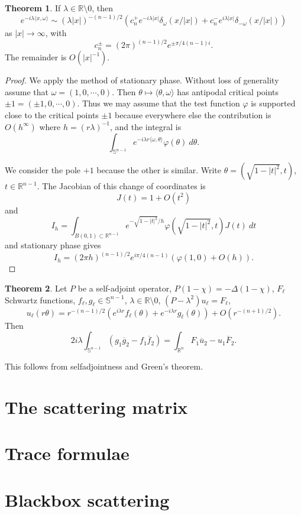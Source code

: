 \documentclass[12pt]{report}
\newcommand{\RR}{\mathbb{R}}
\newcommand{\Sphere}{\mathbb S}
\theoremstyle{definition}
\newtheorem{theorem}{Theorem}[chapter]
\begin{document}
\begin{theorem}
If $\lambda \in \RR \setminus 0$, then
$$e^{-i\lambda\langle x,\omega\rangle}\sim (\lambda|x|)^{-(n-1)/2}(c_n^+ e^{-i\lambda|x|}\delta_\omega(x/|x|) + c_n^- e^{i\lambda|x|}\delta_{-\omega}(x/|x|) )$$
as $|x| \to \infty$, with
$$c_n^\pm = (2\pi)^{(n-1)/2}e^{\pm \pi/4(n-1)i}.$$
The remainder is $O(|x|^{-1})$.
\end{theorem}
\begin{proof}
We apply the method of stationary phase.
Without loss of generality assume that $\omega = (1, 0, \cdots, 0)$. Then $\theta \mapsto \langle \theta, \omega\rangle$ has antipodal critical points $\pm 1 = (\pm 1, 0, \cdots, 0)$.
Thus we may assume that the test function $\varphi$ is supported close to the critical points $\pm 1$ because everywhere else the contribution is $O(h^\infty)$ where $h = (r\lambda)^{-1}$, and the integral is
$$\int_{\Sphere^{n-1}} e^{-i\lambda r\langle \omega,\theta\rangle} \varphi(\theta)~d\theta.$$

We consider the pole $+1$ because the other is similar. Write $\theta = (\sqrt{1 - |t|^2}, t)$, $t \in \RR^{n-1}$.
The Jacobian of this change of coordinates is
$$J(t) = 1 + O(t^2)$$
and
$$I_h = \int_{B(0, 1) \subset \RR^{n-1}} e^{-\sqrt{1 - |t|^2}/h} \varphi(\sqrt{1 - |t|^2}, t)J(t)~dt$$
and stationary phase gives
$$I_h = (2\pi h)^{(n-1)/2}e^{i\pi/4(n-1)}(\varphi(1, 0) + O(h)).$$
\end{proof}

\begin{theorem}
Let $P$ be a self-adjoint operator, $P(1 - \chi) = -\Delta(1 - \chi)$, $F_\ell$ Schwartz functions, $f_\ell, g_\ell \in \Sphere^{n-1}$, $\lambda \in \RR \setminus 0$, $(P - \lambda^2)u_\ell = F_\ell$,
$$u_\ell(r\theta) = r^{-(n-1)/2}(e^{i\lambda r}f_\ell(\theta) + e^{-i\lambda r}g_\ell(\theta)) + O(r^{-(n+1)/2}).$$
Then
$$2i\lambda\int_{\Sphere^{n-1}}(g_1\overline g_2 - f_1\overline f_2) = \int_{\RR^n} F_1\overline u_2 - u_1\overline F_2.$$
\end{theorem}
This follows from selfadjointness and Green's theorem.



\section{The scattering matrix}
\section{Trace formulae}
\section{Blackbox scattering}
\end{document}
